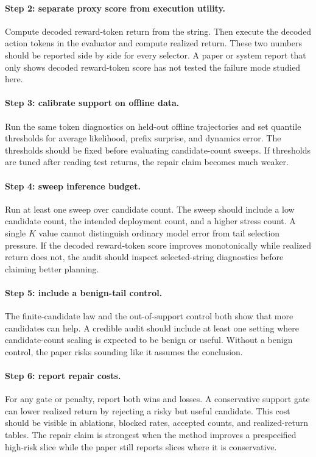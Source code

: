 \documentclass{article}
\begin{document}
\paragraph{Step 2: separate proxy score from execution utility.}
Compute decoded reward-token return from the string. Then execute the decoded action tokens in the evaluator and compute realized return. These two numbers should be reported side by side for every selector. A paper or system report that only shows decoded reward-token score has not tested the failure mode studied here.

\paragraph{Step 3: calibrate support on offline data.}
Run the same token diagnostics on held-out offline trajectories and set quantile thresholds for average likelihood, prefix surprise, and dynamics error. The thresholds should be fixed before evaluating candidate-count sweeps. If thresholds are tuned after reading test returns, the repair claim becomes much weaker.

\paragraph{Step 4: sweep inference budget.}
Run at least one sweep over candidate count. The sweep should include a low candidate count, the intended deployment count, and a higher stress count. A single \(K\) value cannot distinguish ordinary model error from tail selection pressure. If the decoded reward-token score improves monotonically while realized return does not, the audit should inspect selected-string diagnostics before claiming better planning.

\paragraph{Step 5: include a benign-tail control.}
The finite-candidate law and the out-of-support control both show that more candidates can help. A credible audit should include at least one setting where candidate-count scaling is expected to be benign or useful. Without a benign control, the paper risks sounding like it assumes the conclusion.

\paragraph{Step 6: report repair costs.}
For any gate or penalty, report both wins and losses. A conservative support gate can lower realized return by rejecting a risky but useful candidate. This cost should be visible in ablations, blocked rates, accepted counts, and realized-return tables. The repair claim is strongest when the method improves a prespecified high-risk slice while the paper still reports slices where it is conservative.
\end{document}
